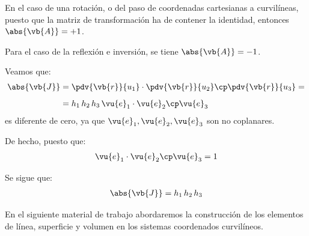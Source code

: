 En el caso de una rotación, o del paso de coordenadas cartesianas a curvilíneas, puesto que la matriz de transformación ha de contener la identidad, entonces $\abs{\vb{A}} = +1$.
 
Para el caso de la reflexión e inversión, se tiene $\abs{\vb{A}} = -1$.

Veamos que:
\begin{align*}
\abs{\vb{J}} &= \pdv{\vb{r}}{u_{1}} \cdot \pdv{\vb{r}}{u_{2}} \cp \pdv{\vb{r}}{u_{3}} = \\[0.5em]
&= h_{1} \, h_{2} \, h_{3} \, \vu{e}_{1} \cdot \vu{e}_{2} \cp \vu{e}_{3}
\end{align*}
es diferente de cero, ya que $\vu{e}_{1}, \vu{e}_{2}, \vu{e}_{3}$ son no coplanares.
\par
De hecho, puesto que:
\begin{align*}
\vu{e}_{1} \cdot \vu{e}_{2} \cp \vu{e}_{3} = 1
\end{align*}

Se sigue que:
\begin{align*}
\abs{\vb{J}} = h_{1} \, h_{2} \, h_{3}
\end{align*}

En el siguiente material de trabajo abordaremos la construcción de los elementos de línea, superficie y volumen en los sistemas coordenados curvilíneos.
